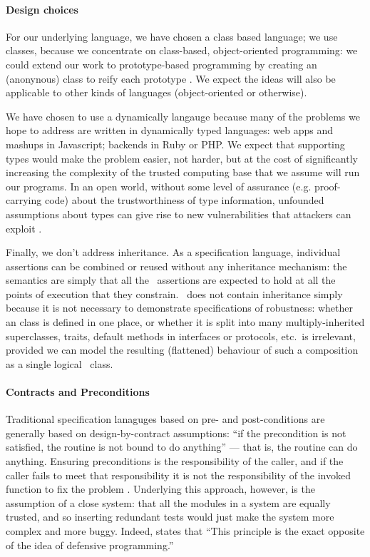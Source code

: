 
\paragraph{Design choices}

For our underlying language, we have chosen a class based language; we
use classes, because we concentrate on class-based, object-oriented
programming: we could extend our work to prototype-based programming
by creating an (anonynous) class to reify each
prototype \cite{graceClasses}. We expect the ideas will also be
applicable to other kinds of languages (object-oriented or
otherwise).

We have chosen to use a dynamically langauge because many of the
problems we hope to address are written in dynamically typed
languages: web apps and mashups in Javascript; backends in Ruby or
PHP.  We expect that supporting types would make the problem easier,
not harder, but at the cost of significantly increasing the complexity
of the trusted computing base that we assume will run our programs. In
an open world, without some level of assurance (e.g. proof-carrying
code) about the trustworthiness of type information, unfounded
assumptions about types can give rise to new vulnerabilities that
attackers can exploit \cite{pickles}.

Finally, we don't address inheritance. As a specification language,
individual \Chainmail assertions can be combined or reused without any
inheritance mechanism: the semantics are simply that all
the \Chainmail\ assertions are expected to hold at all the points of
execution that they constrain.  \LangOO\ does not contain inheritance
simply because it is not necessary to demonstrate specifications of
robustness: whether an \LangOO class is defined in one place, or
whether it is split into many multiply-inherited superclasses, traits,
default methods in interfaces or protocols, etc.\ is irrelevant,
provided we can model the resulting (flattened) behaviour of such a
composition as a single logical \LangOO\ class.

\paragraph{Contracts and Preconditions}

Traditional specification lanaguges based on pre- and post-conditions
are generally based on design-by-contract assumptions: ``if the
precondition is not satisfied, the routine is not bound to do
anything'' \cite{meyer92dbc} --- that is, the routine can do
anything. Ensuring preconditions is the responsibility of the caller,
and if the caller fails to meet that responsibility it is not the
responsibility of the invoked function to fix the problem \cite{oosc}.
Underlying this approach, however, is the assumption of a close
system: that all the modules in a system are equally trusted, and so
inserting redundant tests would just make the system more complex and
more buggy. Indeed, \citet{meyer92dbc} states that ``This principle is
the exact opposite of the idea of defensive programming.''

